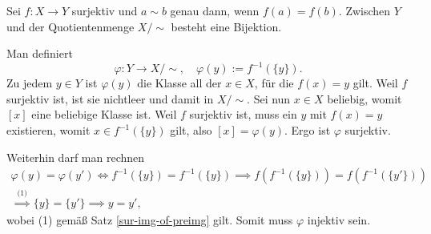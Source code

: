 \begin{Satz}
Sei $f\colon X\to Y$ surjektiv und $a\sim b$ genau dann, wenn
$f(a)=f(b)$. Zwischen $Y$ und der Quotientenmenge $X/{\sim}$
besteht eine Bijektion.
\end{Satz}
\begin{Beweis}[Beweis 1]
Man definiert
\[\varphi\colon Y\to X/{\sim},\quad \varphi(y):=f^{-1}(\{y\}).\]
Zu jedem $y\in Y$ ist $\varphi(y)$ die Klasse all der $x\in X$, für
die $f(x)=y$ gilt. Weil $f$ surjektiv ist, ist sie nichtleer und damit
in $X/{\sim}$. Sei nun $x\in X$ beliebig, womit $[x]$ eine beliebige
Klasse ist. Weil $f$ surjektiv ist, muss ein $y$ mit $f(x)=y$ existieren,
womit $x\in f^{-1}(\{y\})$ gilt, also $[x] = \varphi(y)$. Ergo ist
$\varphi$ surjektiv.

Weiterhin darf man rechnen
\begin{gather*}
\varphi(y) = \varphi(y') \iff f^{-1}(\{y\}) = f^{-1}(\{y\})
\implies f(f^{-1}(\{y\})) = f(f^{-1}(\{y'\}))\\
\stackrel{\text{(1)}}\implies \{y\} = \{y'\} \implies y=y',
\end{gather*}
wobei (1) gemäß Satz \ref{sur-img-of-preimg} gilt. Somit muss
$\varphi$ injektiv sein.\,\qedsymbol
\end{Beweis}

